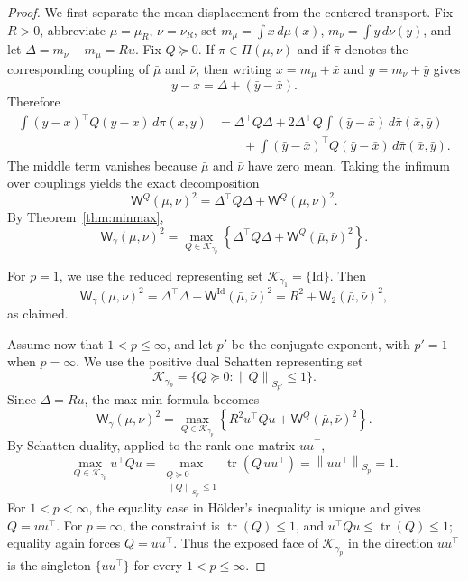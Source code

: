 \documentclass{article}
\newcommand{\Wtwo}{\mathsf{W}_2}
\newcommand{\Wg}{\mathsf{W}_{\gamma}}
\newcommand{\WQ}[1]{\mathsf{W}^{#1}}
\newcommand{\tr}{\operatorname{tr}}
\newcommand{\Id}{\mathrm{Id}}
\newcommand{\norm}[1]{\left\lVert #1 \right\rVert}
\begin{document}
\begin{proof}
We first separate the mean displacement from the centered transport. Fix
$R>0$, abbreviate $\mu=\mu_R$, $\nu=\nu_R$, set
$m_\mu=\int x\,d\mu(x)$, $m_\nu=\int y\,d\nu(y)$, and let
$\Delta=m_\nu-m_\mu=Ru$. Fix
$Q\succeq0$. If $\pi\in\Pi(\mu,\nu)$ and if $\bar\pi$ denotes the corresponding
coupling of $\bar\mu$ and $\bar\nu$, then writing
$x=m_\mu+\bar x$ and $y=m_\nu+\bar y$ gives
\[
    y-x=\Delta+(\bar y-\bar x).
\]
Therefore
\[
\begin{aligned}
    \int (y-x)^\top Q(y-x)\,d\pi(x,y)
    &=
    \Delta^\top Q\Delta
    +
    2\Delta^\top Q
    \int(\bar y-\bar x)\,d\bar\pi(\bar x,\bar y) \\
    &\qquad
    +
    \int(\bar y-\bar x)^\top Q(\bar y-\bar x)\,
    d\bar\pi(\bar x,\bar y).
\end{aligned}
\]
The middle term vanishes because $\bar\mu$ and $\bar\nu$ have zero mean. Taking
the infimum over couplings yields the exact decomposition
\[
    \WQ{Q}(\mu,\nu)^2
    =
    \Delta^\top Q\Delta+\WQ{Q}(\bar\mu,\bar\nu)^2.
\]
By Theorem~\ref{thm:minmax},
\[
    \Wg(\mu,\nu)^2
    =
    \max_{Q\in\mathcal K_{\gamma_p}}
    \left\{
        \Delta^\top Q\Delta+\WQ{Q}(\bar\mu,\bar\nu)^2
    \right\}.
\]

For $p=1$, we use the reduced representing set
$\mathcal K_{\gamma_1}=\{\Id\}$. Then
\[
    \Wg(\mu,\nu)^2
    =
    \Delta^\top\Delta+\WQ{\Id}(\bar\mu,\bar\nu)^2
    =
    R^2+\Wtwo(\bar\mu,\bar\nu)^2,
\]
as claimed.

Assume now that $1<p\le\infty$, and let $p'$ be the conjugate exponent, with
$p'=1$ when $p=\infty$. We use the positive dual Schatten representing set
\[
    \mathcal K_{\gamma_p}
    =
    \{Q\succeq0:\norm{Q}_{S_{p'}}\le1\}.
\]
Since $\Delta=Ru$, the max-min formula becomes
\[
    \Wg(\mu,\nu)^2
    =
    \max_{Q\in\mathcal K_{\gamma_p}}
    \left\{
        R^2 u^\top Q u+\WQ{Q}(\bar\mu,\bar\nu)^2
    \right\}.
\]
By Schatten duality, applied to the rank-one matrix $uu^\top$,
\[
    \max_{Q\in\mathcal K_{\gamma_p}} u^\top Q u
    =
    \max_{\substack{Q\succeq0\\ \norm{Q}_{S_{p'}}\le1}}
    \tr(Q\,uu^\top)
    =
    \norm{uu^\top}_{S_p}
    =
    1.
\]
For $1<p<\infty$, the equality case in H\"older's inequality is unique and gives
$Q=uu^\top$. For $p=\infty$, the constraint is $\tr(Q)\le1$, and
$u^\top Q u\le\tr(Q)\le1$; equality again forces $Q=uu^\top$. Thus the exposed
face of $\mathcal K_{\gamma_p}$ in the direction $uu^\top$ is the singleton
$\{uu^\top\}$ for every $1<p\le\infty$.


\end{proof}
\end{document}
